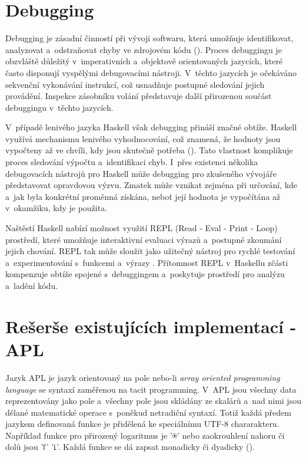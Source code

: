 \documentclass[male, czech]{kithesis}
\begin{document}
\section{Debugging}

Debugging je zásadní činností při vývoji softwaru, 
která umožňuje identifikovat, 
analyzovat a~odstraňovat chyby ve zdrojovém kódu (\cite{WhatIsDebugging}). 
Proces debuggingu je obzvláště důležitý v~imperativních a~objektově orientovaných jazycích, 
které často disponují vyspělými debugovacími nástroji.
V~těchto jazycích je očekáváno sekvenční vykonávání instrukcí, 
což usnadňuje postupné sledování jejich provádění. 
Inspekce zásobníku volání představuje 
další přirozenou součást debuggingu v~těchto jazycích.

V~případě lenivého jazyka Haskell však debugging přináší značné obtíže. 
Haskell využívá mechanismu lenivého vyhodnocování, což znamená, 
že hodnoty jsou vypočteny až ve chvíli, kdy jsou skutečně potřeba (\cite{HaskellDebugging}).
Tato vlastnost komplikuje proces sledování výpočtu a~identifikaci chyb. 
I~přes existenci několika debugovacích nástrojů pro Haskell může 
debugging pro zkušeného vývojáře představovat opravdovou výzvu. 
Zmatek může vznikat zejména při určování, 
kde a~jak byla konkrétní proměnná získána, 
neboť její hodnota je vypočítána až v~okamžiku, 
kdy je použita.

Naštěstí Haskell nabízí možnost využití REPL 
(Read - Eval - Print - Loop) prostředí, 
které umožňuje interaktivní evaluaci výrazů a~postupné zkoumání jejich chování. 
REPL tak může sloužit jako užitečný nástroj pro rychlé testování 
a~experimentování s~funkcemi a~výrazy \cite{HaskellGHCI}. 
Přítomnost REPL v~Haskellu zčásti kompenzuje obtíže spojené 
s~debuggingem a~poskytuje prostředí pro analýzu a~ladění kódu.

\section{Rešerše existujících implementací - APL}

Jazyk APL je jazyk orientovaný na pole nebo-li \textit{array oriented programming language} se 
syntaxí zaměřenou na tacit programming. V~APL jsou všechny data reprezentovány jako pole 
a~všechny pole jsou skládány ze skalárů a~nad 
nimi jsou dělané matematické operace s~poněkud netradiční syntaxí. Totiž každá 
předem jazykem definovaná funkce je přidělená ke speciálnímu UTF-8 chararakteru. 
Například funkce pro přirozený logaritmus je {\apl '⍟'} nebo zaokrouhlení nahoru či dolů 
jsou {\apl '⌈' '⌊'}.
Každá funkce se dá zapsat monadicky či dyadicky (\cite{WhyAPLIsWorthKnowing}).
\end{document}
